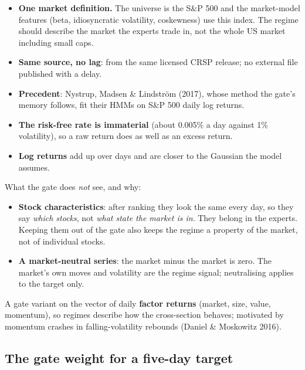 \begin{whybox}
\begin{itemize}
\item \textbf{One market definition.} The universe is the S\&P 500 and the market-model features (beta,
  idiosyncratic volatility, coskewness) use this index. The regime should describe the market the experts
  trade in, not the whole US market including small caps.
\item \textbf{Same source, no lag}: from the same licensed CRSP release; no external file published with a
  delay.
\item \textbf{Precedent}: Nystrup, Madsen \& Lindstr\"om (2017), whose method the gate's memory follows, fit
  their HMMs on S\&P 500 daily log returns.
\item \textbf{The risk-free rate is immaterial} (about 0.005\% a day against 1\% volatility), so a raw return
  does as well as an excess return.
\item \textbf{Log returns} add up over days and are closer to the Gaussian the model assumes.
\end{itemize}
\end{whybox}

What the gate does \emph{not} see, and why:
\begin{itemize}
\item \textbf{Stock characteristics}: after ranking they look the same every day, so they say \emph{which
  stocks}, not \emph{what state the market is in}. They belong in the experts. Keeping them out of the gate
  also keeps the regime a property of the market, not of individual stocks.
\item \textbf{A market-neutral series}: the market minus the market is zero. The market's own moves and
  volatility are the regime signal; neutralising applies to the target only.
\end{itemize}

 A gate variant on the vector of daily \textbf{factor returns} (market, size, value, momentum), so
regimes describe how the cross-section behaves; motivated by momentum crashes in falling-volatility
rebounds (Daniel \& Moskowitz 2016).

\subsection{The gate weight for a five-day target}

